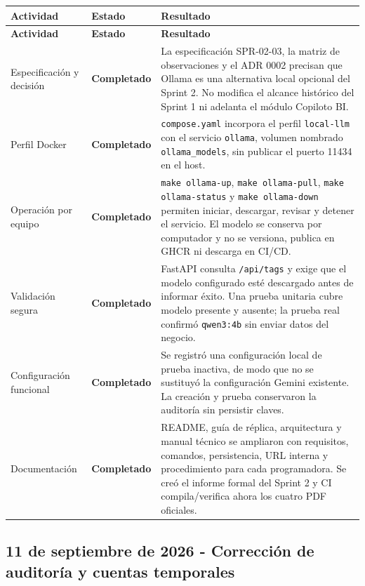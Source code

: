 \documentclass[11pt,letterpaper]{article}
\newcommand{\statusok}{\textcolor{deepgreen}{\textbf{Completado}}}
\newcommand{\file}[1]{\texttt{#1}}
\begin{document}
\begin{longtable}{@{}p{}p{}p{}@{}}
  \toprule
  \textbf{Actividad} & \textbf{Estado} & \textbf{Resultado} \\
  \midrule
  \endfirsthead
  \toprule
  \textbf{Actividad} & \textbf{Estado} & \textbf{Resultado} \\
  \midrule
  \endhead
  Especificación y decisión & \statusok & La especificación SPR-02-03, la matriz de observaciones y el ADR 0002 precisan que Ollama es una alternativa local opcional del Sprint 2. No modifica el alcance histórico del Sprint 1 ni adelanta el módulo Copiloto BI. \\
  Perfil Docker & \statusok & \file{compose.yaml} incorpora el perfil \file{local-llm} con el servicio \file{ollama}, volumen nombrado \file{ollama\_models}, sin publicar el puerto 11434 en el host. \\
  Operación por equipo & \statusok & \file{make ollama-up}, \file{make ollama-pull}, \file{make ollama-status} y \file{make ollama-down} permiten iniciar, descargar, revisar y detener el servicio. El modelo se conserva por computador y no se versiona, publica en GHCR ni descarga en CI/CD. \\
  Validación segura & \statusok & FastAPI consulta \file{/api/tags} y exige que el modelo configurado esté descargado antes de informar éxito. Una prueba unitaria cubre modelo presente y ausente; la prueba real confirmó \file{qwen3:4b} sin enviar datos del negocio. \\
  Configuración funcional & \statusok & Se registró una configuración local de prueba inactiva, de modo que no se sustituyó la configuración Gemini existente. La creación y prueba conservaron la auditoría sin persistir claves. \\
  Documentación & \statusok & README, guía de réplica, arquitectura y manual técnico se ampliaron con requisitos, comandos, persistencia, URL interna y procedimiento para cada programadora. Se creó el informe formal del Sprint 2 y CI compila/verifica ahora los cuatro PDF oficiales. \\
  \bottomrule
\end{longtable}

\clearpage
\subsection{11 de septiembre de 2026 - Corrección de auditoría y cuentas temporales}
\end{document}
